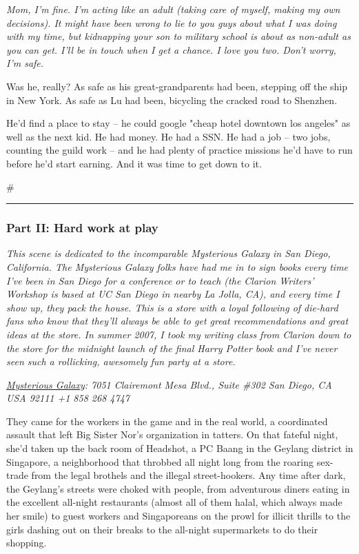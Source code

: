 \emph{Mom, I'm fine. I'm acting like an adult (taking care of myself, making my own decisions). It might have been wrong to lie to you guys about what I was doing with my time, but kidnapping your son to military school is about as non-adult as you can get. I'll be in touch when I get a chance. I love you two. Don't worry, I'm safe.}

Was he, really? As safe as his great-grandparents had been,
stepping off the ship in New York. As safe as Lu had been,
bicycling the cracked road to Shenzhen.

He'd find a place to stay -- he could google "cheap hotel downtown
los angeles" as well as the next kid. He had money. He had a SSN.
He had a job -- two jobs, counting the guild work -- and he had
plenty of practice missions he'd have to run before he'd start
earning. And it was time to get down to it.

\#

\begin{center}\rule{3in}{0.4pt}\end{center}

\subsubsection{Part II: Hard work at play}

\emph{This scene is dedicated to the incomparable Mysterious Galaxy in San Diego, California. The Mysterious Galaxy folks have had me in to sign books every time I've been in San Diego for a conference or to teach (the Clarion Writers' Workshop is based at UC San Diego in nearby La Jolla, CA), and every time I show up, they pack the house. This is a store with a loyal following of die-hard fans who know that they'll always be able to get great recommendations and great ideas at the store. In summer 2007, I took my writing class from Clarion down to the store for the midnight launch of the final Harry Potter book and I've never seen such a rollicking, awesomely fun party at a store.}

\emph{\href{http://www.mystgalaxy.com/book/9780765322166}{Mysterious Galaxy}: 7051 Clairemont Mesa Blvd., Suite \#302 San Diego, CA USA 92111 +1 858 268 4747}

They came for the workers in the game and in the real world, a
coordinated assault that left Big Sister Nor's organization in
tatters.
On that fateful night, she'd taken up the back room of Headshot, a
PC Baang in the Geylang district in Singapore, a neighborhood that
throbbed all night long from the roaring sex-trade from the legal
brothels and the illegal street-hookers. Any time after dark, the
Geylang's streets were choked with people, from adventurous diners
eating in the excellent all-night restaurants (almost all of them
halal, which always made her smile) to guest workers and
Singaporeans on the prowl for illicit thrills to the girls dashing
out on their breaks to the all-night supermarkets to do their
shopping.

